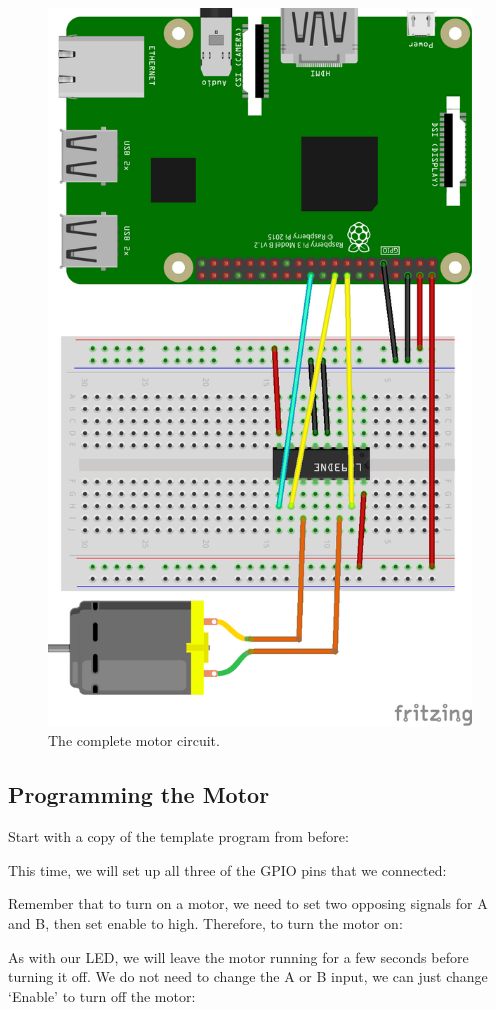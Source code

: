 		\begin{figure}[h]
			\centering
			\includegraphics[width=0.6\linewidth]{img/schematic_5}
			\caption{The complete motor circuit.}
			\label{fig:schematic_5}
		\end{figure}
		
	\subsection{Programming the Motor}
	
		Start with a copy of the template program from before:
		
		\newpage		
		
		
		This time, we will set up all three of the GPIO pins that we connected:
	
		
		
		Remember that to turn on a motor, we need to set two opposing signals for A and B, then set enable to high. Therefore, to turn the motor on:
		
		
		
		As with our LED, we will leave the motor running for a few seconds before turning it off. We do not need to change the A or B input, we can just change `Enable' to turn off the motor:
		
